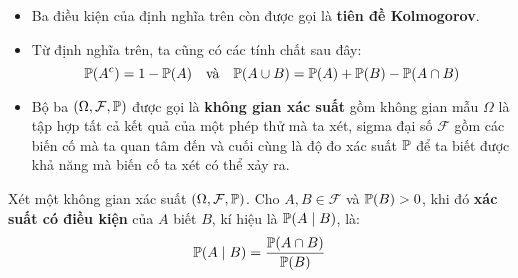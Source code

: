 \begin{itemize}
    \item Ba điều kiện của định nghĩa trên còn được gọi là \textbf{tiên đề Kolmogorov}.

    \item Từ định nghĩa trên, ta cũng có các tính chất sau đây:
    $$
    \P(A^c) = 1 - \P(A) \hspace*{10pt} \text{và} \hspace*{10pt} \P(A \cup B) = \P(A) + \P(B) - \P(A \cap B)
    $$

    \item Bộ ba $(\Omega, \mathcal{F}, \P)$ được gọi là \textbf{không gian xác suất} gồm không gian mẫu $\Omega$ là tập hợp tất cả kết quả của một phép thử mà ta xét, sigma đại số $\mathcal{F}$ gồm các biến cố mà ta quan tâm đến và cuối cùng là độ đo xác suất $\P$ để ta biết được khả năng mà biến cố ta xét có thể xảy ra.


\end{itemize}


\begin{defivn}
    Xét một không gian xác suất $(\Omega, \mathcal{F}, \P)$. Cho $A, B \in \mathcal{F}$ và $\P(B) > 0$, khi đó \textbf{xác suất có điều kiện} của $A$ biết $B$, kí hiệu là $\P(A \mid B)$, là:
    $$
    \P(A \mid B) = \dfrac{\P(A \cap B)}{\P(B)}
    $$
\end{defivn}

